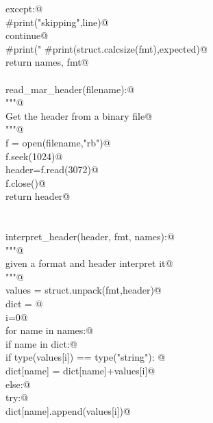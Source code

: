 \documentclass[10pt,a4paper,twoside,notitlepage]{article}
\begin{document}
\begin{flushleft}
\begin{minipage}{\linewidth}
\begin{list}{}{}
\mbox{}\verb@        except:@\\
\mbox{}\verb@            #print("skipping",line)@\\
\mbox{}\verb@            continue@\\
\mbox{}\verb@        #print("%4d %4d"%(mar_c_sizes[type]*times,expected),name,":",times,line)@\\
\mbox{}\verb@    #print(struct.calcsize(fmt),expected)@\\
\mbox{}\verb@    return names, fmt@\\
\mbox{}\verb@@\\
\mbox{}\verb@def read_mar_header(filename):@\\
\mbox{}\verb@    """@\\
\mbox{}\verb@    Get the header from a binary file@\\
\mbox{}\verb@    """@\\
\mbox{}\verb@    f = open(filename,"rb")@\\
\mbox{}\verb@    f.seek(1024)@\\
\mbox{}\verb@    header=f.read(3072)@\\
\mbox{}\verb@    f.close()@\\
\mbox{}\verb@    return header@\\
\mbox{}\verb@@\\
\mbox{}\verb@@\\
\mbox{}\verb@def interpret_header(header, fmt, names):@\\
\mbox{}\verb@    """@\\
\mbox{}\verb@    given a format and header interpret it@\\
\mbox{}\verb@    """@\\
\mbox{}\verb@    values = struct.unpack(fmt,header)@\\
\mbox{}\verb@    dict = {}@\\
\mbox{}\verb@    i=0@\\
\mbox{}\verb@    for name in names:@\\
\mbox{}\verb@        if name in dict:@\\
\mbox{}\verb@            if type(values[i]) == type("string"): @\\
\mbox{}\verb@                 dict[name] = dict[name]+values[i]@\\
\mbox{}\verb@            else:@\\
\mbox{}\verb@                 try:@\\
\mbox{}\verb@                     dict[name].append(values[i])@\\

\end{list}
\end{minipage}
\end{flushleft}
\end{document}
